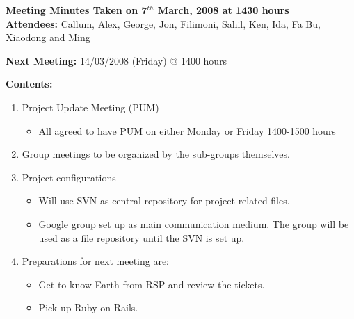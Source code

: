 \documentclass{letter}
\begin{document}
{\large \textbf{\underline{Meeting Minutes Taken on 7$^{th}$ March, 2008 at 1430 hours}}}\\

\textbf{Attendees:} Callum, Alex, George, Jon, Filimoni, Sahil, Ken, Ida, Fa Bu, Xiaodong and Ming

\textbf{Next Meeting:} 14/03/2008 (Friday) @ 1400 hours

\textbf{Contents:}

\begin{enumerate}
\item Project Update Meeting (PUM)
	\begin{itemize}
	\item All agreed to have PUM on either Monday or Friday 1400-1500 hours
	\end{itemize}
\item Group meetings to be organized by the sub-groups themselves.
\item Project configurations
	\begin{itemize}
	\item Will use SVN as central repository for project related files. 
	\item Google group set up as main communication medium. The group will be used as a file repository until the SVN is set up. 
	\end{itemize}
\item Preparations for next meeting are:
	\begin{itemize}
	\item Get to know Earth from RSP and review the tickets. 
	\item Pick-up Ruby on Rails. 
	\end{itemize}
\end{enumerate} 
\end{document}
